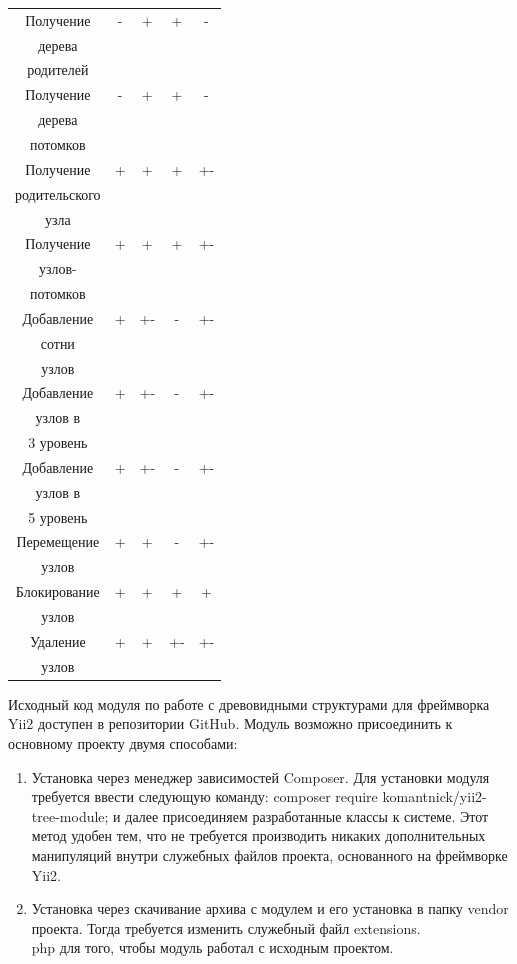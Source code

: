 \documentclass[a4paper,14pt]{extreport}
\theoremstyle{definition}
\begin{document}
\begin{longtable}{|c|c|c|c|c|}
\hline
Получение &-&+&+&- \\
дерева & & & & \\
родителей & & & & \\
\hline
Получение &-&+&+&- \\
дерева & & & & \\
потомков & & & & \\
\hline
Получение &+&+&+&+- \\
родительского & & & & \\
узла & & & & \\
\hline
Получение &+&+&+&+- \\
узлов- & & & & \\
потомков & & & & \\
\hline
Добавление &+&+-&-&+- \\
сотни & & & & \\
узлов & & & & \\
\hline
Добавление &+&+-&-&+- \\
узлов в  & & & & \\
3 уровень & & & & \\
\hline
Добавление &+&+-&-&+- \\
узлов в  & & & & \\
5 уровень & & & & \\
\hline
Перемещение &+&+&-&+- \\
узлов& & & & \\
\hline
Блокирование &+&+&+&+ \\
узлов& & & & \\
\hline
Удаление &+&+&+-&+- \\
узлов& & & & \\
\hline


\end{longtable}
Исходный код модуля по работе с древовидными структурами для фреймворка Yii2 доступен в репозитории GitHub\cite{Komantnick}.
Модуль возможно присоединить к основному проекту двумя способами:
\begin{enumerate}
\item	Установка через менеджер зависимостей Composer\cite{Composer}. Для установки модуля требуется ввести следующую команду: composer require komantnick/yii2-tree-module;
и далее присоединяем разработанные классы к системе. Этот метод удобен тем, что не требуется производить никаких дополнительных манипуляций внутри служебных файлов проекта, основанного на фреймворке Yii2.
\item Установка через скачивание архива с модулем и его установка в папку vendor проекта. Тогда требуется изменить служебный файл extensions.\\php для того, чтобы модуль работал с исходным проектом.
\end{enumerate}
\end{document}
